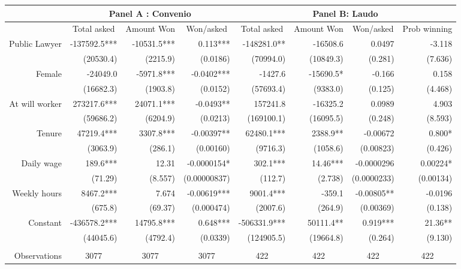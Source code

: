 \begin{tabular}{rrrrrrrr}
\toprule
      & \multicolumn{3}{c}{Panel A : Convenio} & \multicolumn{4}{c}{Panel B: Laudo} \\
\midrule
      & \multicolumn{1}{c}{Total asked} & \multicolumn{1}{c}{Amount Won} & \multicolumn{1}{c}{Won/asked} & \multicolumn{1}{c}{Total asked} & \multicolumn{1}{c}{Amount Won} & \multicolumn{1}{c}{Won/asked} & \multicolumn{1}{c}{Prob winning} \\
Public Lawyer & -137592.5*** & -10531.5*** & 0.113*** & -148281.0** & -16508.6 & 0.0497 & -3.118 \\
      & (20530.4) & (2215.9) & (0.0186) & (70994.0) & (10849.3) & (0.281) & (7.636) \\
Female & -24049.0 & -5971.8*** & -0.0402*** & -1427.6 & -15690.5* & -0.166 & 0.158 \\
      & (16682.3) & (1903.8) & (0.0152) & (57693.4) & (9383.0) & (0.125) & (4.468) \\
At will worker & 273217.6*** & 24071.1*** & -0.0493** & 157241.8 & -16325.2 & 0.0989 & 4.903 \\
      & (59686.2) & (6204.9) & (0.0213) & (169100.1) & (16095.5) & (0.248) & (8.593) \\
Tenure & 47219.4*** & 3307.8*** & -0.00397** & 62480.1*** & 2388.9** & -0.00672 & 0.800* \\
      & (3063.9) & (286.1) & (0.00160) & (9716.3) & (1058.6) & (0.00823) & (0.426) \\
Daily wage & 189.6*** & 12.31 & -0.0000154* & 302.1*** & 14.46*** & -0.0000296 & 0.00224* \\
      & (71.29) & (8.557) & (0.00000837) & (112.7) & (2.738) & (0.0000233) & (0.00134) \\
Weekly hours & 8467.2*** & 7.674 & -0.00619*** & 9001.4*** & -359.1 & -0.00805** & -0.0196 \\
      & (675.8) & (69.37) & (0.000474) & (2007.6) & (264.9) & (0.00369) & (0.138) \\
Constant & -436578.2*** & 14795.8*** & 0.648*** & -506331.9*** & 50111.4** & 0.919*** & 21.36** \\
      & (44045.6) & (4792.4) & (0.0339) & (124905.5) & (19664.8) & (0.264) & (9.130) \\
      &       &       &       &       &       &       &  \\
      \midrule
Observations & \multicolumn{1}{c}{3077} & \multicolumn{1}{c}{3077} & \multicolumn{1}{c}{3077} & \multicolumn{1}{c}{422} & \multicolumn{1}{c}{422} & \multicolumn{1}{c}{422} & \multicolumn{1}{c}{422} \\

\end{tabular}
